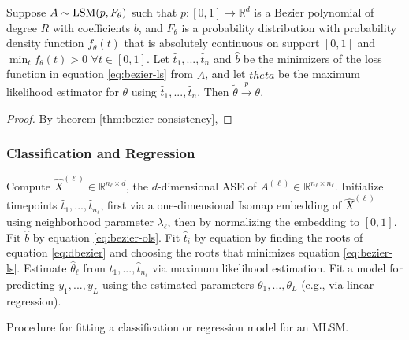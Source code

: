 \documentclass[12pt]{article}
\begin{document}
\begin{theorem}
Suppose $A \sim \mathrm{LSM}(p, F_\theta)$ such that $p : [0, 1] \to \mathbb{R}^d$ is a Bezier polynomial of degree $R$ with coefficients $b$, and $F_\theta$ is a probability distribution with probability density function $f_\theta(t)$ that is absolutely continuous on support $[0, 1]$ and $\min_t f_\theta(t) > 0$ $\forall t \in [0, 1]$. 
Let $\hat{t}_1, ..., \hat{t}_n$ and $\hat{b}$ be the minimizers of the loss function in equation \ref{eq:bezier-ls} from $A$, and let $\tilde{theta}$ be the maximum likelihood estimator for $\theta$ using $\hat{t}_1, ..., \hat{t}_n$. 
Then $\tilde{\theta} \stackrel{p}{\to} \theta$. 
\end{theorem}

\begin{proof}
By theorem \ref{thm:bezier-consistency}, 
\end{proof}

\subsubsection{Classification and
Regression}\label{classification-and-regression}

\begin{algorithm}[H]
\label{alg:mlsm-fit}
\DontPrintSemicolon
\SetAlgoLined
{}
 {
  Compute $\hat{X}^{(\ell)} \in \mathbb{R}^{n_\ell \times d}$, the $d$-dimensional ASE of $A^{(\ell)} \in \mathbb{R}^{n_\ell \times n_\ell}$.\;
  Initialize timepoints $\hat{t}_1, ..., \hat{t}_{n_\ell}$, first via a one-dimensional Isomap embedding of $\hat{X}^{(\ell)}$ using neighborhood parameter $\lambda_\ell$, then by normalizing the embedding to $[0, 1]$.\;
   {
    Fit $\hat{b}$ by equation \ref{eq:bezier-ols}.\;
     {
      Fit $\hat{t}_i$ by equation by finding the roots of equation \ref{eq:dbezier} and choosing the roots that minimizes equation \ref{eq:bezier-ls}.\;
    }
  }
  Estimate $\hat{\theta}_\ell$ from $\hat{t}_1, ..., \hat{t}_{n_\ell}$ via maximum likelihood estimation.\;
}
Fit a model for predicting $y_1, ..., y_L$ using the estimated parameters $\theta_1, ..., \theta_L$ (e.g., via linear regression).\;
\caption{Procedure for fitting a classification or regression model for an MLSM.}
\end{algorithm}
\end{document}
